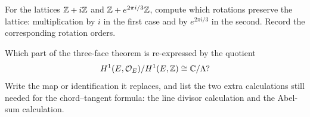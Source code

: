 \begin{exercise}
For the lattices \(\mathbb{Z}+i\mathbb{Z}\) and \(\mathbb{Z}+e^{2\pi i/3}\mathbb{Z}\), compute which rotations
preserve the lattice: multiplication by \(i\) in the first case and by
\(e^{2\pi i/3}\) in the second.  Record the corresponding rotation orders.
\end{exercise}

\begin{exercise}
Which part of the three-face theorem is re-expressed by the quotient
\[
  H^1(E,\mathcal{O}_E)/H^1(E,\mathbb{Z})\cong\mathbb{C}/\Lambda?
\]
Write the map or identification it replaces, and list the two extra calculations
still needed for the chord--tangent formula: the line divisor calculation and
the Abel-sum calculation.
\end{exercise}

